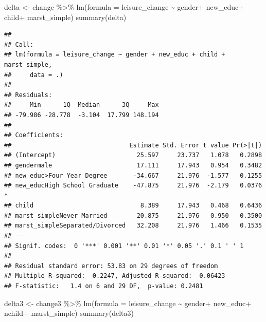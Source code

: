 \documentclass[
]{article}
\newenvironment{Shaded}{\begin{snugshade}}{\end{snugshade}}
\newcommand{\AttributeTok}[1]{\textcolor[rgb]{0.77,0.63,0.00}{#1}}
\newcommand{\FunctionTok}[1]{\textcolor[rgb]{0.00,0.00,0.00}{#1}}
\newcommand{\NormalTok}[1]{#1}
\newcommand{\OtherTok}[1]{\textcolor[rgb]{0.56,0.35,0.01}{#1}}
\newcommand{\SpecialCharTok}[1]{\textcolor[rgb]{0.00,0.00,0.00}{#1}}
\begin{document}
\begin{Shaded}
\begin{Highlighting}[]
\NormalTok{delta }\OtherTok{\textless{}{-}}\NormalTok{ change }\SpecialCharTok{\%\textgreater{}\%}
  \FunctionTok{lm}\NormalTok{(}\AttributeTok{formula =}\NormalTok{ leisure\_change }\SpecialCharTok{\textasciitilde{}}\NormalTok{ gender}\SpecialCharTok{+}\NormalTok{ new\_educ}\SpecialCharTok{+}\NormalTok{ child}\SpecialCharTok{+}\NormalTok{ marst\_simple)}
\FunctionTok{summary}\NormalTok{(delta)}
\end{Highlighting}
\end{Shaded}

\begin{verbatim}
## 
## Call:
## lm(formula = leisure_change ~ gender + new_educ + child + marst_simple, 
##     data = .)
## 
## Residuals:
##     Min      1Q  Median      3Q     Max 
## -79.986 -28.778  -3.104  17.799 148.194 
## 
## Coefficients:
##                                Estimate Std. Error t value Pr(>|t|)  
## (Intercept)                      25.597     23.737   1.078   0.2898  
## gendermale                       17.111     17.943   0.954   0.3482  
## new_educ>Four Year Degree       -34.667     21.976  -1.577   0.1255  
## new_educHigh School Graduate    -47.875     21.976  -2.179   0.0376 *
## child                             8.389     17.943   0.468   0.6436  
## marst_simpleNever Married        20.875     21.976   0.950   0.3500  
## marst_simpleSeparated/Divorced   32.208     21.976   1.466   0.1535  
## ---
## Signif. codes:  0 '***' 0.001 '**' 0.01 '*' 0.05 '.' 0.1 ' ' 1
## 
## Residual standard error: 53.83 on 29 degrees of freedom
## Multiple R-squared:  0.2247, Adjusted R-squared:  0.06423 
## F-statistic:   1.4 on 6 and 29 DF,  p-value: 0.2481
\end{verbatim}

\begin{Shaded}
\begin{Highlighting}[]
\NormalTok{delta3 }\OtherTok{\textless{}{-}}\NormalTok{ change3 }\SpecialCharTok{\%\textgreater{}\%}
  \FunctionTok{lm}\NormalTok{(}\AttributeTok{formula =}\NormalTok{ leisure\_change }\SpecialCharTok{\textasciitilde{}}\NormalTok{ gender}\SpecialCharTok{+}\NormalTok{ new\_educ}\SpecialCharTok{+}\NormalTok{ nchild}\SpecialCharTok{+}\NormalTok{ marst\_simple)}
\FunctionTok{summary}\NormalTok{(delta3)}
\end{Highlighting}
\end{Shaded}
\end{document}
